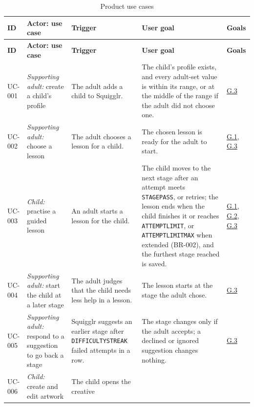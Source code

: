 \documentclass[12pt]{article}
\renewcommand{\_}{\textunderscore\allowbreak}%
\newcommand{\goalref}[1]{\hyperref[goal:#1]{G.#1}}
\begin{document}
{\footnotesize
\setlength{\tabcolsep}{4pt}
\begin{longtable}{@{}
  >{\raggedright\arraybackslash}p{}
  >{\raggedright\arraybackslash}p{}
  >{\raggedright\arraybackslash}p{}
  >{\raggedright\arraybackslash}p{}
  >{\raggedright\arraybackslash}p{}@{}} \caption{Product use
  cases}\label{tab:puc}\\
\toprule
\textbf{ID} & \textbf{Actor: use case} & \textbf{Trigger} & \textbf{User goal} &
\textbf{Goals} \\
\midrule
\endfirsthead
\toprule
\textbf{ID} & \textbf{Actor: use case} & \textbf{Trigger} & \textbf{User goal} &
\textbf{Goals} \\
\midrule
\endhead
\bottomrule
\endlastfoot
{}\label{uc:001}%
UC-001 & \emph{Supporting adult:} create a child's profile & The adult adds a
child to Squigglr. & The child's profile exists, and every adult-set value is
within its range, or at the middle of the range if the adult did not choose one.
& \goalref{3} \\
\addlinespace
{}\label{uc:002}%
UC-002 & \emph{Supporting adult:} choose a lesson & The adult chooses a lesson
for a child. & The chosen lesson is ready for the adult to start. & \goalref{1},
\goalref{3} \\
\addlinespace
{}\label{uc:003}%
UC-003 & \emph{Child:} practise a guided lesson & An adult starts a lesson for
the child. & The child moves to the next stage after an attempt meets
\texttt{STAGE\_PASS}, or retries; the lesson ends when the child finishes it or
reaches \texttt{ATTEMPT\_LIMIT}, or \texttt{ATTEMPT\_LIMIT\_MAX} when extended
(BR-002), and the furthest stage reached is saved. & \goalref{1}, \goalref{2},
\goalref{3} \\
\addlinespace
{}\label{uc:004}%
UC-004 & \emph{Supporting adult:} start the child at a later stage & The adult
judges that the child needs less help in a lesson. & The lesson starts at the
stage the adult chose. & \goalref{3} \\
\addlinespace
{}\label{uc:005}%
UC-005 & \emph{Supporting adult:} respond to a suggestion to go back a stage &
Squigglr suggests an earlier stage after \texttt{DIFFICULTY\_STREAK} failed
attempts in a row. & The stage changes only if the adult accepts; a declined or
ignored suggestion changes nothing. & \goalref{3} \\
\addlinespace
{}\label{uc:006}%
UC-006 & \emph{Child:} create and edit artwork & The child opens the creative

\end{longtable}}
\end{document}
